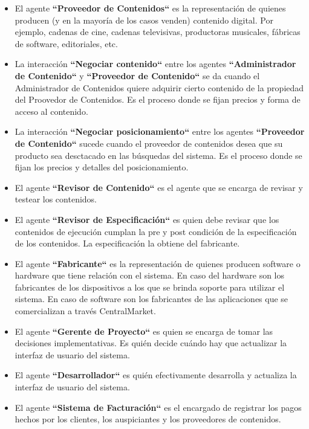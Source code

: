 \documentclass[11pt, a4paper, spanish]{article}
\begin{document}
\begin{itemize}
	\item El agente \textbf{``Proveedor de Contenidos``} es la representaci\'on de quienes producen (y en la mayor\'ia de los casos venden) 
	contenido digital. Por ejemplo, cadenas de cine, cadenas televisivas, productoras musicales, f\'abricas de software, editoriales, etc. 

	\item La interacci\'on \textbf{``Negociar contenido``} entre los agentes \textbf{``Administrador de Contenido``} y \textbf{``Proveedor de 
	Contenido``} se da cuando el Administrador de Contenidos quiere adquirir cierto contenido de la propiedad del Proovedor de Contenidos. Es el 
	proceso donde se fijan precios y forma de acceso al contenido.
	   
	\item La interacci\'on \textbf{``Negociar posicionamiento``} entre los agentes \textbf{``Proveedor de Contenido``} sucede cuando el proveedor de 
	contenidos desea que su producto sea desctacado en las b\'usquedas del sistema. Es el proceso donde se fijan los precios y detalles del 
	posicionamiento.

	\item El agente \textbf{``Revisor de Contenido``} es el agente que se encarga de revisar y testear los contenidos.

	\item El agente \textbf{``Revisor de Especificaci\'on``} es quien debe revisar que los contenidos de ejecuci\'on cumplan la pre y post condici\'on de la especificaci\'on de los contenidos.
	La especificaci\'on la obtiene del fabricante.

	\item El agente \textbf{``Fabricante``} es la representaci\'on de quienes producen software o hardware que tiene relaci\'on con el sistema. 
	En caso del hardware son los fabricantes de los dispositivos a los que se brinda soporte para utilizar el sistema. En caso de software son los 
	fabricantes de las aplicaciones que se comercializan a trav\'es CentralMarket.

	\item El agente \textbf{``Gerente de Proyecto``} es quien se encarga de tomar las decisiones implementativas. Es qui\'en decide cu\'ando hay que 
	actualizar la interfaz de usuario del sistema.

	\item El agente \textbf{``Desarrollador``} es qui\'en efectivamente desarrolla y actualiza la interfaz de usuario del sistema.

	\item El agente \textbf{``Sistema de Facturaci\'on``} es el encargado de registrar los pagos hechos por los clientes, los auspiciantes y los 
	proveedores de contenidos.


\end{itemize}
\end{document}

